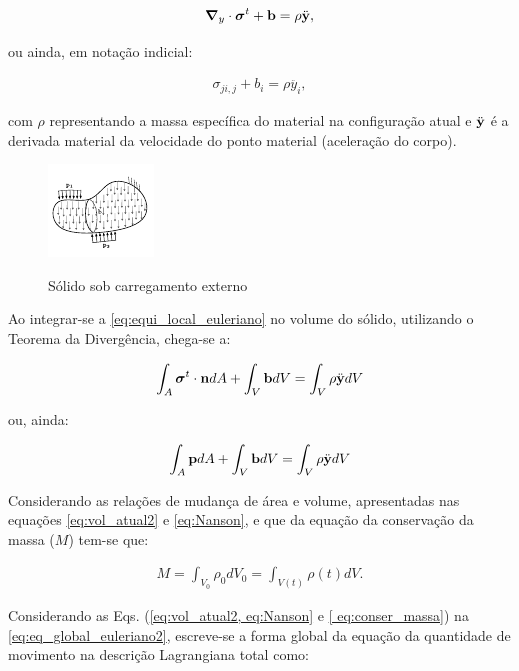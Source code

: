 \begin{align}
	\boldsymbol{\nabla}_y \cdot \boldsymbol{\sigma}^{t} + \mathbf{b} = \rho  \ddot{\mathbf{y}}, \label{eq:equi_local_euleriano}
\end{align}

\noindent ou ainda, em notação indicial:

\begin{align}
	\sigma_{ji,j} + b_i  = \rho  \ddot{y_i},
\end{align}

\noindent com $\rho$ representando a massa específica do material na configuração atual e $\ddot{\mathbf{y}}$ é a derivada material da velocidade do ponto material (aceleração do corpo).

\begin{figure}[!htbp]
	\caption{Sólido sob carregamento externo}
	\centering
	\includegraphics[scale=4,trim=0cm 0.0cm 0cm 0cm, clip=true]{Imagens/Cap4/sol_cargas.pdf}	
	\label{fig:sol_cargas}
\end{figure}

Ao integrar-se a \autoref{eq:equi_local_euleriano} no volume do sólido, utilizando o Teorema da Divergência, chega-se a:

\begin{align}
	\int_{A} {\boldsymbol{\sigma}}^{t} \cdot \mathbf{n} dA + \int_{V} \mathbf{b} dV = \int_{V} \rho  \ddot{\mathbf{y}} dV \label{eq:eq_global_euleriano}
\end{align}

\noindent ou, ainda:

\begin{align}
	\int_{A} \mathbf{p} dA + \int_{V} \mathbf{b} dV = \int_{V} \rho  \ddot{\mathbf{y}} dV 
\end{align}

Considerando as relações de mudança de área e volume, apresentadas nas equações \autoref{eq:vol_atual2} e \autoref{eq:Nanson}, e que da equação da conservação da massa ($M$) tem-se que:

\begin{align}
	M = \int_{V_{0}} \rho_{0}dV_{0} = \int_{V(t)} \rho(t)dV. \label{eq:conser_massa}
\end{align}

Considerando as Eqs. (\ref{eq:vol_atual2, eq:Nanson} e \ref{ eq:conser_massa}) na \autoref{eq:eq_global_euleriano2}, escreve-se a forma global da equação da quantidade de movimento na descrição Lagrangiana total como:

